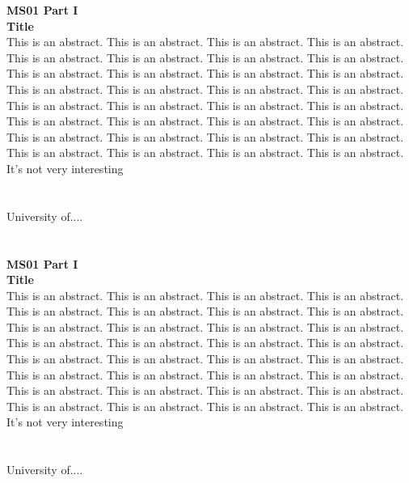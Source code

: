 \begin{multicols}{2}
\noindent\textbf{MS01 Part I}\\
\textbf{Title}\\
This is an abstract. This is an abstract. This is an abstract. This is an abstract. This is an abstract. This is an abstract. This is an abstract. This is an abstract. This is an abstract. This is an abstract. This is an abstract. This is an abstract. This is an abstract. This is an abstract. This is an abstract. This is an abstract. This is an abstract. This is an abstract. This is an abstract. This is an abstract. This is an abstract. This is an abstract. This is an abstract. This is an abstract. This is an abstract. This is an abstract. This is an abstract. This is an abstract. This is an abstract. This is an abstract. This is an abstract. This is an abstract. \\It's not very interesting\\\\
\\
University of....\\
\\\\

\noindent\textbf{MS01 Part I}\\
\textbf{Title}\\
This is an abstract. This is an abstract. This is an abstract. This is an abstract. This is an abstract. This is an abstract. This is an abstract. This is an abstract. This is an abstract. This is an abstract. This is an abstract. This is an abstract. This is an abstract. This is an abstract. This is an abstract. This is an abstract. This is an abstract. This is an abstract. This is an abstract. This is an abstract. This is an abstract. This is an abstract. This is an abstract. This is an abstract. This is an abstract. This is an abstract. This is an abstract. This is an abstract. This is an abstract. This is an abstract. This is an abstract. This is an abstract. \\It's not very interesting\\\\
\\
University of....\\
\\\\


\end{multicols}

